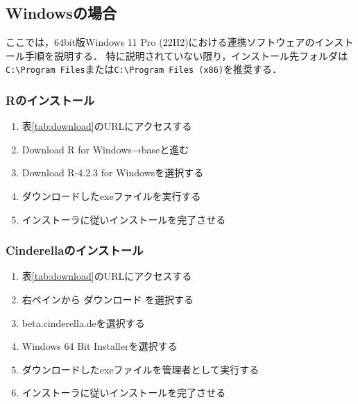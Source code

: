 \subsection{Windowsの場合}

ここでは，64bit版Windows 11 Pro (22H2)における連携ソフトウェアのインストール手順を説明する．
特に説明されていない限り，インストール先フォルダは\verb|C:\Program Files|または\verb|C:\Program Files (x86)|を推奨する．

\subsubsection{Rのインストール}
\begin{enumerate}
    \item 表\ref{tab:download}のURLにアクセスする
    \item Download R for Windows→baseと進む
    \item Download R-4.2.3 for Windowsを選択する
    \item ダウンロードしたexeファイルを実行する
    \item インストーラに従いインストールを完了させる
\end{enumerate}

\newpage

\subsubsection{Cinderellaのインストール}
\begin{enumerate}
    \item 表\ref{tab:download}のURLにアクセスする
    \item 右ペインから ダウンロード を選択する
    \item beta.cinderella.deを選択する
    \item Windows 64 Bit Installerを選択する
    \item ダウンロードしたexeファイルを管理者として実行する
    \item インストーラに従いインストールを完了させる
\end{enumerate}

